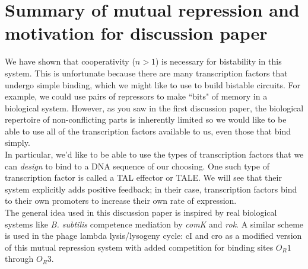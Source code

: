 \documentclass{article}
\begin{document}
\section*{Summary of mutual repression and motivation for discussion paper}

We have shown that cooperativity ($n>1$) is necessary for bistability in this system. This is unfortunate because there are many transcription factors that undergo simple binding, which we might like to use to build bistable circuits. For example, we could use pairs of repressors to make ``bits" of memory in a biological system. However, as you saw in the first discussion paper, the biological repertoire of non-conflicting parts is inherently limited so we would like to be able to use all of the transcription factors available to us, even those that bind simply. \\

In particular, we'd like to be able to use the types of transcription factors that we can \textit{design} to bind to a DNA sequence of our choosing. One such type of transcription factor is called a TAL effector or TALE. We will see that their system explicitly adds positive feedback; in their case, transcription factors bind to their own promoters to increase their own rate of expression.\\

The general idea used in this discussion paper is inspired by real biological systems like \textit{B. subtilis} competence mediation by \textit{comK} and \textit{rok}. A similar scheme is used in the phage lambda lysis/lysogeny cycle: cI and cro as a modified version of this mutual repression system with added competition for binding sites $O_R1$ through $O_R3$.
\end{document}
